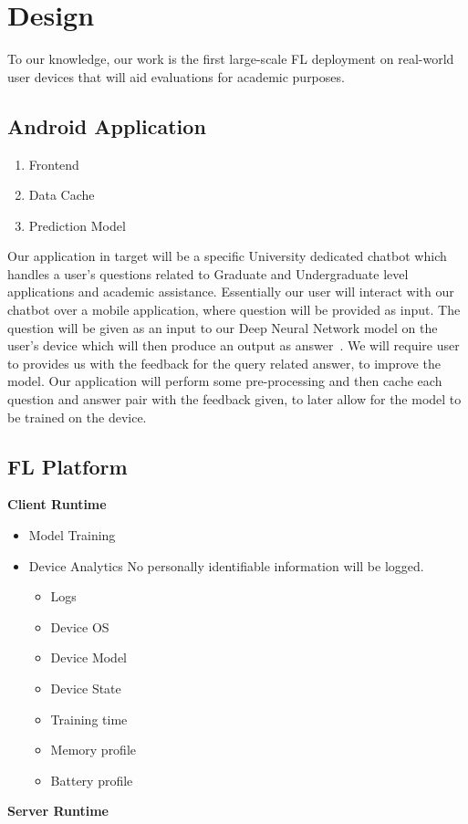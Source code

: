 \section{Design}
    To our knowledge, our work is the first large-scale FL deployment on real-world user devices that will aid evaluations for academic purposes.

    \subsection{Android Application}
        \begin{enumerate}
            \item Frontend
            \item Data Cache
            \item Prediction Model
            \newline
        \end{enumerate}

        Our application in target will be a specific University dedicated chatbot which handles a user's questions related to Graduate and Undergraduate level applications and academic assistance. Essentially our user will interact with our chatbot over a mobile application, where question will be provided as input. The question will be given as an input to our Deep Neural Network model on the user's device which will then produce an output as answer~\cite{9225395}. We will require user to provides us with the feedback for the query related answer, to improve the model. Our application will perform some pre-processing and then cache each question and answer pair with the feedback given, to later allow for the model to be trained on the device.
    
        \subsection{FL Platform}
        \textbf{Client Runtime}
            \begin{itemize}
                \item Model Training
                \item Device Analytics \newline
                    No personally identifiable information will be logged.  
                    \begin{itemize}
                        \item Logs
                        \item Device OS
                        \item Device Model
                        \item Device State
                        \item Training time
                        \item Memory profile
                        \item Battery profile
                    \end{itemize}
            \end{itemize}
        \textbf{Server Runtime}
